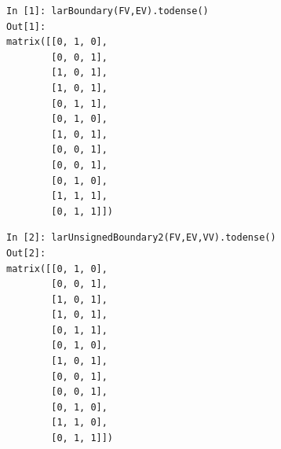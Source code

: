 \documentclass[11pt,oneside]{article}    %
\begin{document}
{\scriptsize
\begin{minipage}[c]{0.5\linewidth}
\centering
\begin{verbatim}
In [1]: larBoundary(FV,EV).todense()
Out[1]: 
matrix([[0, 1, 0],
        [0, 0, 1],
        [1, 0, 1],
        [1, 0, 1],
        [0, 1, 1],
        [0, 1, 0],
        [1, 0, 1],
        [0, 0, 1],
        [0, 0, 1],
        [0, 1, 0],
        [1, 1, 1],
        [0, 1, 1]])
\end{verbatim}
\end{minipage}
\begin{minipage}[c]{0.5\linewidth}
\centering
\begin{verbatim}
In [2]: larUnsignedBoundary2(FV,EV,VV).todense()
Out[2]: 
matrix([[0, 1, 0],
        [0, 0, 1],
        [1, 0, 1],
        [1, 0, 1],
        [0, 1, 1],
        [0, 1, 0],
        [1, 0, 1],
        [0, 0, 1],
        [0, 0, 1],
        [0, 1, 0],
        [1, 1, 0],
        [0, 1, 1]])
\end{verbatim}
\end{minipage}}
\end{document}
